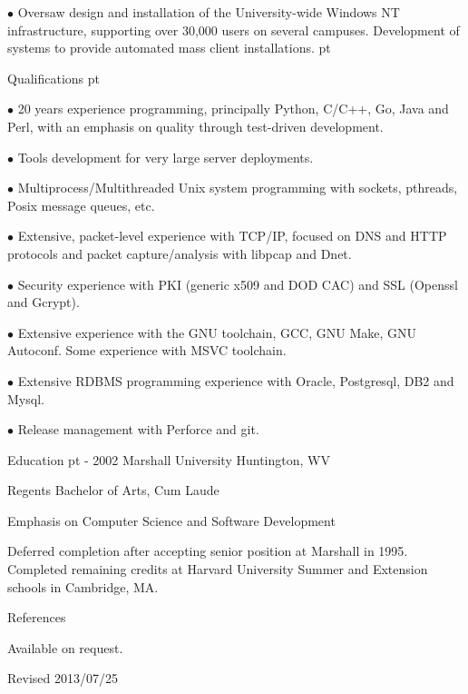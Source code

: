 \item{$\bullet$} Oversaw design and installation of the University-wide Windows NT infrastructure, supporting over 30,000 users on several campuses. Development of systems to provide automated mass client installations.
 pt

{\category Qualifications}
 pt
\item{$\bullet$} 20 years experience programming, principally Python, C/C++, Go, Java and Perl, with an emphasis on quality through test-driven development.

\item{$\bullet$} Tools development for very large server deployments.

\item{$\bullet$} Multiprocess/Multithreaded Unix system programming with sockets, pthreads, Posix message queues, etc.

\item{$\bullet$} Extensive, packet-level experience with TCP/IP, focused on DNS and HTTP protocols and packet capture/analysis with libpcap and Dnet.

\item{$\bullet$} Security experience with PKI (generic x509 and DOD CAC) and SSL (Openssl and Gcrypt).

\item{$\bullet$} Extensive experience with the GNU toolchain, GCC, GNU Make, GNU Autoconf. Some experience with MSVC toolchain.

\item{$\bullet$} Extensive RDBMS programming experience with Oracle, Postgresql, DB2 and Mysql.

\item{$\bullet$} Release management with Perforce and git. 

\vskip 9pt
{\category Education}
 pt
{ - 2002	Marshall University	Huntington, WV}

{\item{} Regents Bachelor of Arts, Cum Laude }

{\item{} Emphasis on Computer Science and Software Development }

{\item{} Deferred completion after accepting senior position at
Marshall in 1995. Completed remaining credits at Harvard University Summer and Extension schools in Cambridge, MA. }
\vskip 9pt
{\category References}
\item{} Available on request.
{
\hf
\vfill
\centerline{Revised 2013/07/25} 
}

\bye
